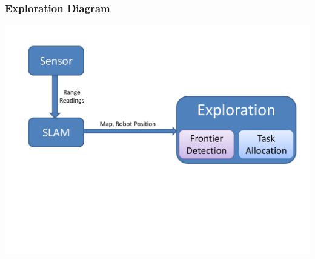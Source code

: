 \begin{frame}
\frametitle{Exploration Diagram}
\includegraphics[width=1.0\columnwidth,keepaspectratio]{images/exploration_diagram.pdf}
\end{frame}